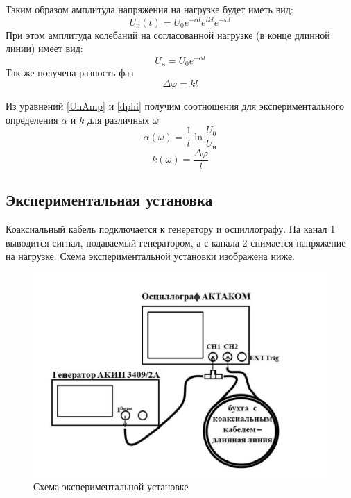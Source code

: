 \documentclass[a4paper,12pt]{article}
\theoremstyle{definition}
\begin{document}
 	Таким образом амплитуда напряжения на нагрузке будет иметь вид:
 	\begin{equation}\label{Un}
 		U_\text{н}(t)=U_0e^{-\alpha l}e^{ikl}e^{-\omega t}
 	\end{equation}
 	При этом амплитуда колебаний на согласованной нагрузке (в конце длинной линии) имеет вид:
 	\begin{equation}\label{UnAmp}
 		U_\text{н}=U_0e^{-\alpha l}
 	\end{equation}
 	Так же получена разность фаз
 	\begin{equation}\label{dphi}
 		\Delta \varphi=kl
 	\end{equation}
 	
 	Из уравнений \eqref{UnAmp} и \eqref{dphi} получим соотношения для экспериментального определения $\alpha$ и $k$ для различных $\omega$
 	\begin{equation}\label{alphaomega}
 		\alpha(\omega)=\frac{1}{l}\ln\frac{U_0}{U_\text{н}}
 	\end{equation}
 	\begin{equation}\label{komega}
 		k(\omega)=\frac{\Delta \varphi}{l}
 	\end{equation}

 	\subsection*{Экспериментальная установка}
 	Коаксиальный кабель подключается к генератору и осциллографу. На канал 1 выводится сигнал, подаваемый генератором, а с канала 2 снимается напряжение на нагрузке. Схема экспериментальной установки изображена ниже.
 	\newpage
 	\begin{figure}[h!]
 		\centering
 		\includegraphics[scale=0.7]{2.png}
 		\caption{Схема экспериментальной установке}
 	\end{figure}
 
\end{document}
